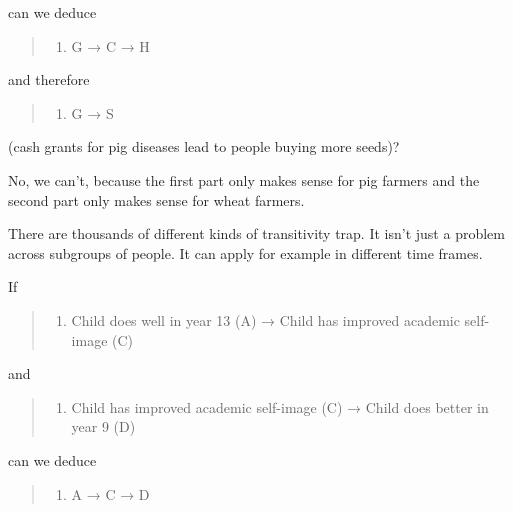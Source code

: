 \documentclass[
]{book}
\providecommand{\tightlist}{%
  \setlength{\itemsep}{0pt}\setlength{\parskip}{0pt}}
\begin{document}
can we deduce

\begin{quote}
\begin{enumerate}
\def\labelenumi{\arabic{enumi})}
\setcounter{enumi}{2}
\tightlist
\item
  G → C → H
\end{enumerate}
\end{quote}

and therefore

\begin{quote}
\begin{enumerate}
\def\labelenumi{\arabic{enumi})}
\setcounter{enumi}{3}
\tightlist
\item
  G → S
\end{enumerate}
\end{quote}

(cash grants for pig diseases lead to people buying more seeds)?

No, we can't, because the first part only makes sense for pig farmers and the second part only makes sense for wheat farmers.

There are thousands of different kinds of transitivity trap. It isn't just a problem across subgroups of people. It can apply for example in different time frames.

If

\begin{quote}
\begin{enumerate}
\def\labelenumi{\arabic{enumi})}
\tightlist
\item
  Child does well in year 13 (A) → Child has improved academic self-image (C)
\end{enumerate}
\end{quote}

and

\begin{quote}
\begin{enumerate}
\def\labelenumi{\arabic{enumi})}
\setcounter{enumi}{1}
\tightlist
\item
  Child has improved academic self-image (C) → Child does better in year 9 (D)
\end{enumerate}
\end{quote}

can we deduce

\begin{quote}
\begin{enumerate}
\def\labelenumi{\arabic{enumi})}
\setcounter{enumi}{2}
\tightlist
\item
  A → C → D
\end{enumerate}
\end{quote}
\end{document}
